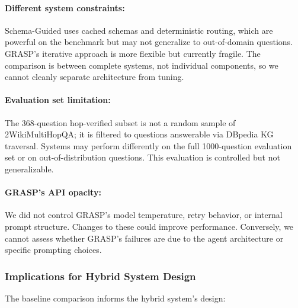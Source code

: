 \paragraph{Different system constraints:} Schema-Guided uses cached schemas and deterministic routing, which are powerful on the benchmark but may not generalize to out-of-domain questions. GRASP's iterative approach is more flexible but currently fragile. The comparison is between complete systems, not individual components, so we cannot cleanly separate architecture from tuning.

\paragraph{Evaluation set limitation:} The 368-question hop-verified subset is not a random sample of 2WikiMultiHopQA; it is filtered to questions answerable via DBpedia KG traversal. Systems may perform differently on the full 1000-question evaluation set or on out-of-distribution questions. This evaluation is controlled but not generalizable.

\paragraph{GRASP's API opacity:} We did not control GRASP's model temperature, retry behavior, or internal prompt structure. Changes to these could improve performance. Conversely, we cannot assess whether GRASP's failures are due to the agent architecture or specific prompting choices.

\subsubsection{Implications for Hybrid System Design}

The baseline comparison informs the hybrid system's design:

